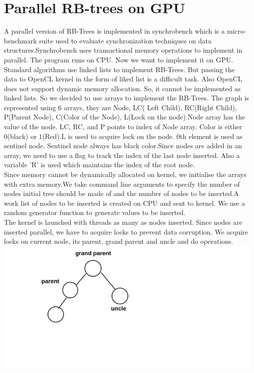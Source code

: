 \documentclass[BTech]{iitmdiss}
\begin{document}
\chapter{Parallel RB-trees on GPU}
A parallel version of RB-Trees is implemented in synchrobench which is a micro-benchmark suite used to evaluate synchronization techniques on data structures.Synchrobench uses transactional memory operations to implement in parallel. The program runs on CPU. Now we want to implement it on GPU. Standard algorithms use linked lists to implement RB-Trees. But passing the data to OpenCL kernel in the form of liked list is a difficult task. Also OpenCL does not support dynamic memory allocation. So, it cannot be implemented as linked lists. So we decided to use arrays to implement the RB-Trees. The graph is represented using 6 arrays, they are Node, LC( Left Child), RC(Right Child), P(Parent Node), C(Color of the Node), L(Lock on the node).Node array has the value of the node. LC, RC, and P points to index of Node array. Color is either 0(black) or 1(Red).L is used to acquire lock on the node. 0th element is used as sentinel node. Sentinel node always has black color.Since nodes are added in an array, we need to use a flag to track the index of the last node inserted. Also a variable 'R' is used which maintains the index of the root node.\\
Since memory cannot be dynamically allocated on kernel, we initialise the arrays with extra memory.We take command line arguments to specify the number of nodes initial tree should be made of and the number of nodes to be inserted.A work list of nodes to be inserted is created on CPU and sent to kernel. We use a random generator function to generate values to be inserted.\\
The kernel is launched with threads as many as nodes inserted. Since nodes are inserted parallel, we have to acquire locks to prevent data corruption. We acquire locks on current node, its parent, grand parent and uncle and do operations.\\
\includegraphics{img1.png}
\end{document}
